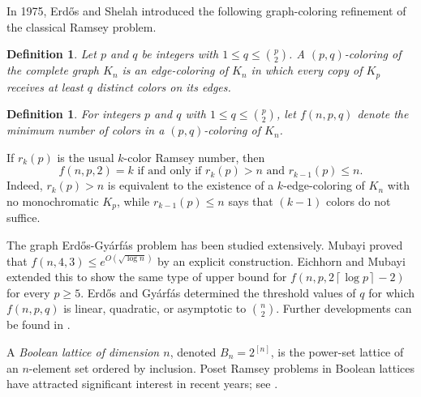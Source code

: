 \documentclass[twoside,12pt]{article}
\newcommand{\ceil}[1]{\left\lceil #1 \right\rceil}
\newtheorem{definition}[theorem]{Definition}
\begin{document}
In 1975, Erd\H{o}s and Shelah \cite{Er75,Er81} introduced the following graph-coloring refinement of the classical Ramsey problem.

\begin{definition}
Let $p$ and $q$ be integers with $1 \le q \le \binom{p}{2}$. A \emph{$(p,q)$-coloring} of the complete graph $K_n$ is an edge-coloring of $K_n$ in which every copy of $K_p$ receives at least $q$ distinct colors on its edges.
\end{definition}

\begin{definition}
For integers $p$ and $q$ with $1 \le q \le \binom{p}{2}$, let $f(n,p,q)$ denote the minimum number of colors in a $(p,q)$-coloring of $K_n$.
\end{definition}

If $r_k(p)$ is the usual $k$-color Ramsey number, then
\[
f(n,p,2)=k
\text{ if and only if }
r_k(p)>n \text{ and } r_{k-1}(p)\le n.
\]
Indeed, $r_k(p)>n$ is equivalent to the existence of a $k$-edge-coloring of $K_n$ with no monochromatic $K_p$, while $r_{k-1}(p)\le n$ says that $(k-1)$ colors do not suffice.

The graph Erd\H{o}s-Gy\'{a}rf\'{a}s problem has been studied extensively. Mubayi \cite{Mu98} proved that $f(n,4,3)\le e^{O(\sqrt{\log n})}$ by an explicit construction. Eichhorn and Mubayi \cite{EM00} extended this to show the same type of upper bound for $f(n,p,2\ceil{\log p}-2)$ for every $p\ge5$. Erd\H{o}s and Gy\'{a}rf\'{a}s \cite{EG97} determined the threshold values of $q$ for which $f(n,p,q)$ is linear, quadratic, or asymptotic to $\binom{n}{2}$. Further developments can be found in \cite{BEHK23,CFLS152,CH23,EG97,EM00,Mu98,Yip26}.

A \emph{Boolean lattice of dimension $n$}, denoted $B_n=2^{[n]}$, is the power-set lattice of an $n$-element set ordered by inclusion. Poset Ramsey problems in Boolean lattices have attracted significant interest in recent years; see \cite{AW23,GKM,KMOW25,GMT23,BP2021,Winter25,Winter23}.
\end{document}
